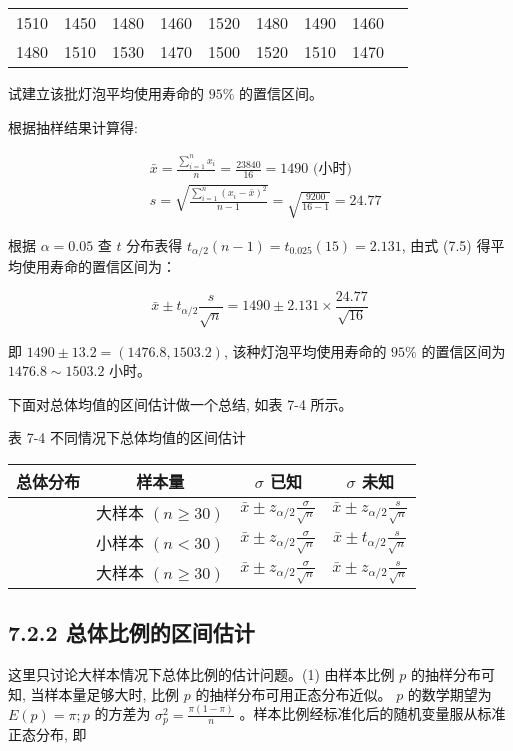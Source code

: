 \documentclass[10pt]{article}
\begin{document}
\begin{CJK*}{UTF8}{bsmi}
\begin{center}
\begin{tabular}{lllllllll}
1510 & 1450 & 1480 & 1460 & 1520 & 1480 & 1490 & 1460 \\
1480 & 1510 & 1530 & 1470 & 1500 & 1520 & 1510 & 1470 \\
\end{tabular}
\end{center}

试建立该批灯泡平均使用寿命的 $95 \%$ 的置信区间。

根据抽样结果计算得:

$$
\begin{aligned}
& \bar{x}=\frac{\sum_{i=1}^{n} x_{i}}{n}=\frac{23840}{16}=1490 \text { (小时) } \\
& s=\sqrt{\frac{\sum_{i=1}^{n}\left(x_{i}-\bar{x}\right)^{2}}{n-1}}=\sqrt{\frac{9200}{16-1}}=24.77
\end{aligned}
$$

根据 $\alpha=0.05$ 查 $t$ 分布表得 $t_{\alpha / 2}(n-1)=t_{0.025}(15)=2.131$, 由式 (7.5) 得平均使用寿命的置信区间为：

$$
\bar{x} \pm t_{\alpha / 2} \frac{s}{\sqrt{n}}=1490 \pm 2.131 \times \frac{24.77}{\sqrt{16}}
$$

即 $1490 \pm 13.2=(1476.8,1503.2)$, 该种灯泡平均使用寿命的 $95 \%$ 的置信区间为\\
$1476.8 \sim 1503.2$ 小时。

下面对总体均值的区间估计做一个总结, 如表 7-4 所示。

表 7-4 不同情况下总体均值的区间估计

\begin{center}
\begin{tabular}{cccc}
\hline
总体分布 & 样本量 & $\sigma$ 已知 & $\sigma$ 未知 \\
\hline
 & 大样本 $(n \geqslant 30)$ & $\bar{x} \pm z_{\alpha / 2} \frac{\sigma}{\sqrt{n}}$ & $\bar{x} \pm z_{\alpha / 2} \frac{s}{\sqrt{n}}$ \\
 & 小样本 $(n<30)$ & $\bar{x} \pm z_{\alpha / 2} \frac{\sigma}{\sqrt{n}}$ & $\bar{x} \pm t_{\alpha / 2} \frac{s}{\sqrt{n}}$ \\
 & 大样本 $(n \geqslant 30)$ & $\bar{x} \pm z_{\alpha / 2} \frac{\sigma}{\sqrt{n}}$ & $\bar{x} \pm z_{\alpha / 2} \frac{s}{\sqrt{n}}$ \\
\hline
\end{tabular}
\end{center}

\subsection*{7.2.2 总体比例的区间估计}
这里只讨论大样本情况下总体比例的估计问题。(1) 由样本比例 $p$ 的抽样分布可知, 当样本量足够大时, 比例 $p$ 的抽样分布可用正态分布近似。 $p$ 的数学期望为 $E(p)=\pi ; p$ 的方差为 $\sigma_{p}^{2}=\frac{\pi(1-\pi)}{n}$ 。样本比例经标准化后的随机变量服从标准正态分布, 即



\end{CJK*}
\end{document}

